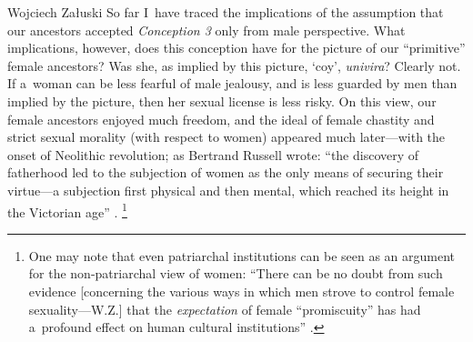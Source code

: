 \begin{artengenv}{Wojciech Załuski}
So far I~have traced the implications of the assumption that our ancestors accepted \textit{Conception 3} only from male perspective. What implications, however, does this conception have for the picture of our ``primitive'' female ancestors? Was she, as implied by this picture, ‘coy', \textit{univira}? Clearly not. If a~woman can be less fearful of male jealousy, and is less guarded by men than implied by the picture, then her sexual license is less risky. On this view, our female ancestors enjoyed much freedom, and the ideal of female chastity and strict sexual morality (with respect to women) appeared much later---with the onset of Neolithic revolution; as Bertrand Russell wrote: ``the discovery of fatherhood led to the subjection of women as the only means of securing their virtue---a subjection first physical and then mental, which reached its height in the Victorian age''
\parencite[][p.12]{russell_marriage_1929}.%
\footnote{One may note that even patriarchal institutions can be seen as an argument for the non-patriarchal view of women: ``There can be no doubt from such evidence [concerning the various ways in which men strove to control female sexuality---W.Z.] that the \textit{expectation} of female ``promiscuity'' has had a~profound effect on human cultural institutions'' 
\parencite[][pp.176--177]{hrdy_woman_1999}.%
}


\end{artengenv}
